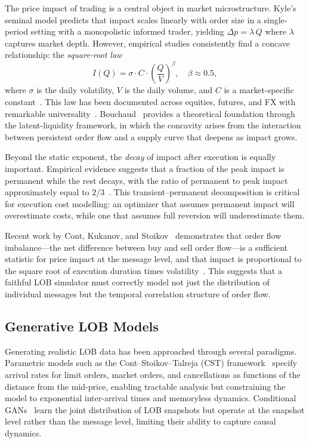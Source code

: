 \documentclass[sigplan,screen,anonymous]{acmart}
\begin{document}
The price impact of trading is a central object in market microstructure. Kyle's~\cite{kyle1985continuous} seminal model predicts that impact scales linearly with order size in a single-period setting with a monopolistic informed trader, yielding $\Delta p = \lambda \, Q$ where $\lambda$ captures market depth. However, empirical studies consistently find a concave relationship: the \emph{square-root law}
\begin{equation}
  I(Q) = \sigma \cdot C \cdot \left(\frac{Q}{V}\right)^{\beta}, \quad \beta \approx 0.5,
  \label{eq:sqrt_law}
\end{equation}
where $\sigma$ is the daily volatility, $V$ is the daily volume, and $C$ is a market-specific constant~\cite{torre1997barra, almgren2005direct, lillo2003master, toth2011anomalous}. This law has been documented across equities, futures, and FX with remarkable universality~\cite{bouchaud2018trades}. Bouchaud~\cite{bouchaud2010price} provides a theoretical foundation through the latent-liquidity framework, in which the concavity arises from the interaction between persistent order flow and a supply curve that deepens as impact grows.

Beyond the static exponent, the \emph{decay} of impact after execution is equally important. Empirical evidence suggests that a fraction of the peak impact is permanent while the rest decays, with the ratio of permanent to peak impact approximately equal to $2/3$~\cite{bouchaud2018trades}. This transient--permanent decomposition is critical for execution cost modelling: an optimizer that assumes permanent impact will overestimate costs, while one that assumes full reversion will underestimate them.

Recent work by Cont, Kukanov, and Stoikov~\cite{cont2014price} demonstrates that order flow imbalance---the net difference between buy and sell order flow---is a sufficient statistic for price impact at the message level, and that impact is proportional to the square root of execution duration times volatility~\cite{capponi2019multi}. This suggests that a faithful LOB simulator must correctly model not just the distribution of individual messages but the temporal correlation structure of order flow.

\subsection{Generative LOB Models}

Generating realistic LOB data has been approached through several paradigms. Parametric models such as the Cont--Stoikov--Talreja (CST) framework~\cite{stoikov2008option} specify arrival rates for limit orders, market orders, and cancellations as functions of the distance from the mid-price, enabling tractable analysis but constraining the model to exponential inter-arrival times and memoryless dynamics. Conditional GANs~\cite{coletta2023conditional} learn the joint distribution of LOB snapshots but operate at the snapshot level rather than the message level, limiting their ability to capture causal dynamics.
\end{document}
